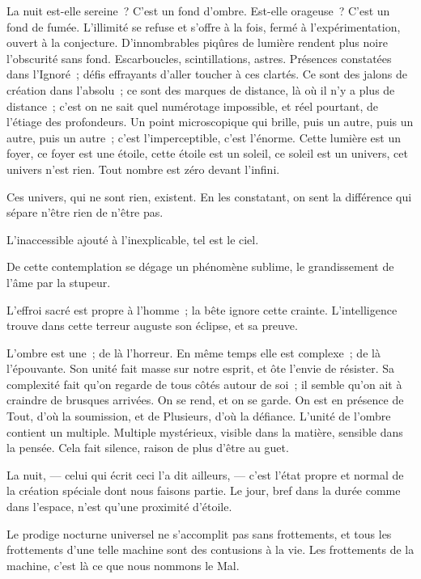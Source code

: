 \documentclass[french,twoside]{book} %
\begin{document}
La nuit est-elle sereine ? C’est un fond d’ombre. Est-elle orageuse ? C’est un fond de fumée. L’illimité se refuse et s’offre à la fois, fermé à l’expérimentation, ouvert à la conjecture. D’innombrables piqûres de lumière rendent plus noire l’obscurité sans fond. Escarboucles, scintillations, astres. Présences constatées dans l’Ignoré ; défis effrayants d’aller toucher à ces  clartés. Ce sont des jalons de création dans l’absolu ; ce sont des marques de distance, là où il n’y a plus de distance ; c’est on ne sait quel numérotage impossible, et réel pourtant, de l’étiage des profondeurs. Un point microscopique qui brille, puis un autre, puis un autre, puis un autre ; c’est l’imperceptible, c’est l’énorme. Cette lumière est un foyer, ce foyer est une étoile, cette étoile est un soleil, ce soleil est un univers, cet univers n’est rien. Tout nombre est zéro devant l’infini.\par
Ces univers, qui ne sont rien, existent. En les constatant, on sent la différence qui sépare n’être rien de n’être pas.\par
L’inaccessible ajouté à l’inexplicable, tel est le ciel.\par
De cette contemplation se dégage un phénomène sublime, le grandissement de l’âme par la stupeur.\par
L’effroi sacré est propre à l’homme ; la bête ignore cette crainte. L’intelligence trouve dans cette terreur auguste son éclipse, et sa preuve.\par
L’ombre est une ; de là l’horreur. En même temps elle est complexe ; de là l’épouvante. Son unité fait masse sur notre esprit, et ôte l’envie de résister. Sa complexité fait qu’on regarde de tous côtés autour de soi ; il semble qu’on ait à craindre de brusques arrivées. On se rend, et on se garde. On est en présence de Tout, d’où la soumission, et de Plusieurs, d’où la défiance. L’unité de l’ombre contient un multiple. Multiple mystérieux, visible dans la matière, sensible dans la pensée. Cela fait silence, raison de plus d’être au guet.\par
 La nuit, — celui qui écrit ceci l’a dit ailleurs, — c’est l’état propre et normal de la création spéciale dont nous faisons partie. Le jour, bref dans la durée comme dans l’espace, n’est qu’une proximité d’étoile.\par
Le prodige nocturne universel ne s’accomplit pas sans frottements, et tous les frottements d’une telle machine sont des contusions à la vie. Les frottements de la machine, c’est là ce que nous nommons le Mal.\par
\end{document}
